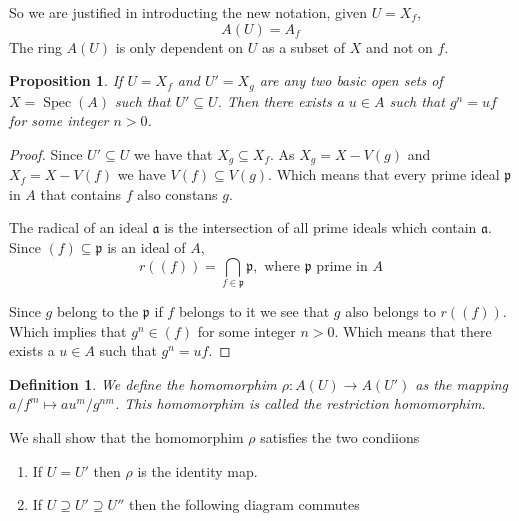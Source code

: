 \documentclass[]{report}
\newtheorem{prop}[theorem]{Proposition}
\newtheorem{defn}[theorem]{Definition}
\DeclareMathOperator\Spec{Spec}
\begin{document}
So we are justified in introducting the new notation, given $U = X_f$, 
    $$A(U) = A_f$$ 
    The ring $A(U)$ is only dependent on $U$ as a subset of $X$ and not on $f$.


\begin{prop}
    If $U = X_f$ and $U' = X_g$ are any two \textit{basic open sets} of $X = \Spec(A)$ such that $U' \subseteq U$. 
    Then there exists a $u \in A$ such that $g^n = uf$ for some integer $n > 0$. 
\end{prop}
\begin{proof}
    Since $U' \subseteq U$ we have that $X_g \subseteq X_f$. As $X_g = X - V(g)$ and $X_f = X - V(f)$ we have $V(f) \subseteq V(g)$. Which means that every prime ideal $\mathfrak{p}$ in $A$ that contains $f$ also constans $g$.

    The radical of an ideal $\mathfrak{a}$ is the intersection of all prime ideals which contain $\mathfrak{a}$. Since $(f) \subseteq \mathfrak{p}$ is an ideal of $A$, 
    $$r((f)) = \bigcap_{f \in \mathfrak{p}} \mathfrak{p}, \text{ where } \mathfrak{p} \text{ prime in } A$$

    Since $g$ belong to the $\mathfrak{p}$ if $f$ belongs to it we see that $g$ also belongs to $r((f))$. Which implies that $g^n \in (f)$ for some integer $n > 0$. Which means that there exists a $u \in A$ such that $g^n = uf$.
\end{proof}


\begin{defn}
    We define the homomorphim $\rho: A(U) \rightarrow A(U')$ as the mapping $a/f^m \mapsto au^m/g^{nm}$. This homomorphim is called the \textit{restriction} homomorphim.
\end{defn}

We shall show that the homomorphim $\rho$ satisfies the two condiions
    \begin{enumerate}
        \item If $U = U'$ then $\rho$ is the identity map.
        \item If $U \supseteq U' \supseteq U''$ then the following diagram commutes 
            \begin{center}
        \end{center}
    \end{enumerate} 
\end{document}

